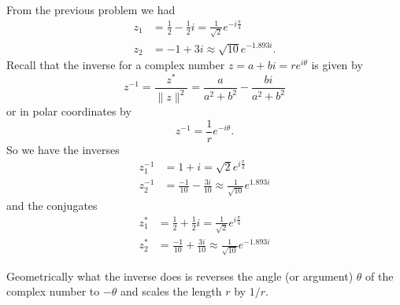 \documentclass[12pt]{article} %
\begin{document}
\begin{solution}
From the previous problem we had
\begin{align*}
z_1 &= \frac{1}{2}-\frac{1}{2}i = \frac{1}{\sqrt{2}}e^{-i\frac{\pi}{4}}\\
z_2 &= -1 + 3i \approx \sqrt{10}e^{-1.893i}.
\end{align*}
Recall that the inverse for a complex number $z=a+bi=re^{i\theta}$ is given by
\[
z^{-1}=\frac{z^*}{\|z\|^2}=\frac{a}{a^2+b^2}-\frac{bi}{a^2+b^2}
\]
or in polar coordinates by
\[
z^{-1}=\frac{1}{r}e^{-i\theta}.
\]
So we have the inverses
\begin{align*}
    z_1^{-1} &= 1+i = \sqrt{2}e^{i\frac{\pi}{4}}\\
    z_2^{-1} &= \frac{-1}{10}-\frac{3i}{10} \approx \frac{1}{\sqrt{10}} e^{1.893i}
\end{align*}
and the conjugates
\begin{align*}
    z_1^* &= \frac{1}{2}+\frac{1}{2}i = \frac{1}{\sqrt{2}}e^{i\frac{\pi}{4}}\\
    z_2^* &= \frac{-1}{10}+\frac{3i}{10} \approx \frac{1}{\sqrt{10}} e^{-1.893i}
\end{align*}
    \begin{center}
        \end{center}
    Geometrically what the inverse does is reverses the angle (or argument) $\theta$ of the complex number to $-\theta$ and scales the length $r$ by $1/r$. 
\end{solution}
\newpage
\end{document}
